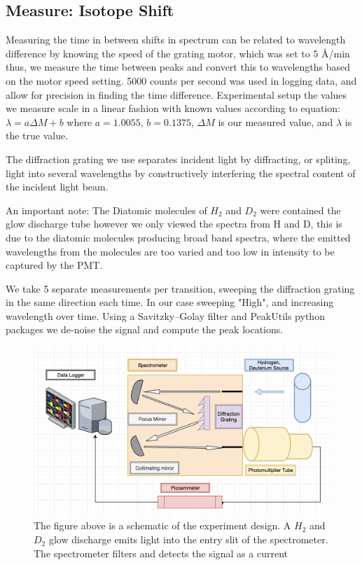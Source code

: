 \documentclass{article}
\begin{document}
\subsection{Measure: Isotope Shift}

Measuring the time in between shifts in spectrum can be related to wavelength difference by knowing the speed of the grating motor, which was set to 5 {\AA}/min thus, we measure the time between peaks and convert this to wavelengths based on the motor speed setting. 5000 counts per second was used in logging data, and allow for precision in finding the time difference. Experimental setup the values we measure scale in a linear fashion with known values according to equation:  $\lambda = a\Delta M + b$ where $a = 1.0055$, $b = 0.1375$, $\Delta M$ is our measured value, and $\lambda$ is the true value.

\newline
The diffraction grating we use separates incident light by diffracting, or spliting, light into several wavelengths by constructively interfering the spectral content of the incident light beam.   

\newline
An important note: The Diatomic molecules of $H_2$ and $D_2$ were contained the glow discharge tube however we only viewed the spectra from H and D, this is due to the diatomic molecules producing broad band spectra, where the emitted wavelengths from the molecules are too varied and too low in intensity to be captured by the PMT. 






\newline

We take 5 separate measurements per transition, sweeping the diffraction grating in the same direction each time. In our case sweeping "High", and increasing wavelength over time. Using a Savitzky–Golay filter and PeakUtils python packages we de-noise the signal and compute the peak locations.


\begin{figure}[H]
\begin{center}
  \includegraphics[width=\linewidth]{expDiagram.png}
  \caption{The figure above is a schematic of the experiment design. A $H_2$ and $D_2$ glow discharge emits light into the entry slit of the spectrometer. The spectrometer filters and detects the signal as a current  }
  \label{fig:boat1}
\end{center}
\end{figure}
\end{document}
